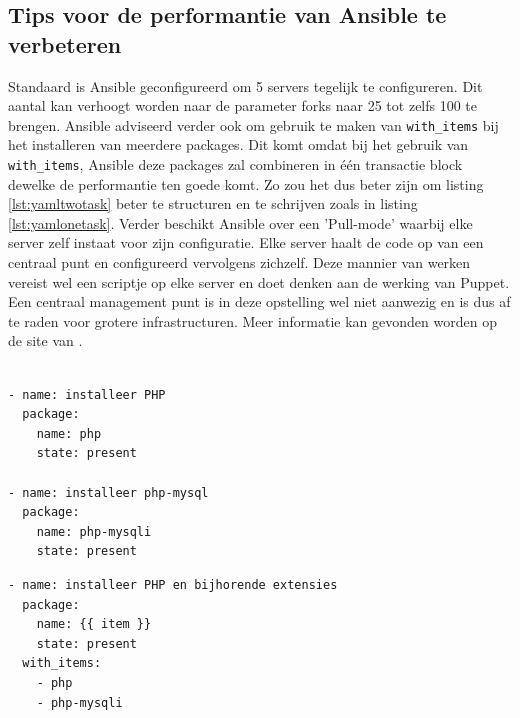  \subsection{Tips voor de performantie van Ansible te verbeteren}
 Standaard is Ansible geconfigureerd om 5 servers tegelijk te configureren. Dit aantal kan verhoogt worden naar de parameter forks naar 25 tot zelfs 100 te brengen. \newline
Ansible adviseerd verder ook om gebruik te maken van \texttt{with\_items} bij het installeren van meerdere packages. Dit komt omdat bij het gebruik van \texttt{with\_items}, Ansible deze packages zal combineren in \'e\'en transactie block dewelke de performantie ten goede komt. Zo zou het dus beter zijn om listing \ref{lst:yamltwotask} beter te structuren en te schrijven zoals in listing \ref{lst:yamlonetask}. \newline
Verder beschikt Ansible over een 'Pull-mode' waarbij elke server zelf instaat voor zijn configuratie. Elke server haalt de code op van een centraal punt en configureerd vervolgens zichzelf. Deze mannier van werken vereist wel een scriptje op elke server en doet denken aan de werking van Puppet. Een centraal management punt is in deze opstelling wel niet aanwezig en is dus af te raden voor grotere infrastructuren. Meer informatie kan gevonden worden op de site van  \textcite{AnsibleTuning} .

\begin{lstlisting}[frame=single]

- name: installeer PHP
  package:
    name: php
    state: present

- name: installeer php-mysql
  package:
    name: php-mysqli
    state: present
\end{lstlisting}

\begin{lstlisting}[frame=single]
- name: installeer PHP en bijhorende extensies
  package:
    name: {{ item }}
    state: present
  with_items:
    - php
    - php-mysqli
\end{lstlisting}
  \autocite{AnsibleTuning}
  
  
